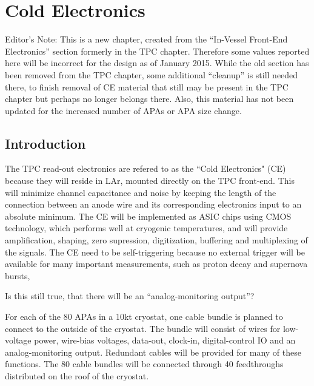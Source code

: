 \chapter{Cold Electronics}
\label{ch:ce}

\begin{editornote}
  Editor's Note:  This is a new chapter, created from the ``In-Vessel Front-End Electronics'' section formerly in the TPC chapter.
Therefore some values reported here will be incorrect for the design as of January 2015. 
While the old section has been removed from the TPC chapter, some additional ``cleanup'' is still needed there,
to finish removal of CE material that still may be present in the TPC chapter but perhaps no longer belongs there.
Also, this material has not been updated for the increased number of APAs or APA size change.
\end{editornote}

\section{Introduction}
\label{sec:ce-intro}

The TPC read-out electronics are refered to as the ``Cold Electronics" (CE) because they will reside in LAr,
mounted directly on the TPC front-end.
This will minimize channel capacitance and noise by keeping the length of the connection between an anode wire
and its corresponding electronics input to an absolute minimum.
The CE will be implemented as ASIC chips using CMOS technology, which performs well at cryogenic temperatures,
and will provide amplification, shaping, zero supression, digitization, buffering and multiplexing of the signals.
The CE need to be self-triggering because no external trigger will be available for many important measurements,
such as proton decay and supernova bursts,

\begin{editornote}
  Is this still true, that there will be an ``analog-monitoring output''?
\end{editornote}
For each of the 80 APAs in a 10kt cryostat, one cable bundle is planned to connect to the outside of the cryostat.
The bundle will consist of wires for low-voltage power, wire-bias voltages, data-out, clock-in,
digital-control IO and an analog-monitoring output.
Redundant cables will be provided for many of these functions.
The 80 cable bundles will be connected through 40 feedthroughs distributed on the roof of the cryostat.

